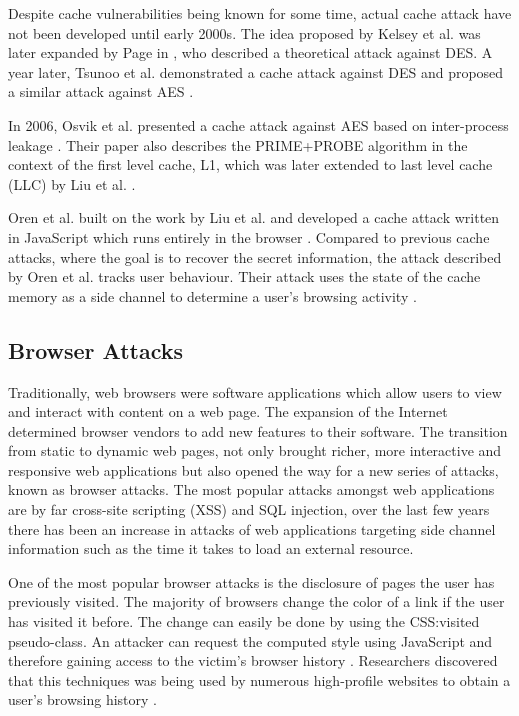 \documentclass[10pt,a4paper,twoside]{book}
\begin{document}
Despite cache vulnerabilities being known for some time, actual cache attack have not been developed until early 2000s. The idea proposed by Kelsey et al. was later expanded by Page in \cite{page2002theoretical}, who described a theoretical attack against DES. A year later, Tsunoo et al. demonstrated a cache attack against DES and proposed a similar attack against AES \cite{tsunoo2003cryptanalysis}.

In 2006, Osvik et al. presented a cache attack against AES based on inter-process leakage \cite{osvik2006cache}. Their paper also describes the PRIME+PROBE algorithm in the context of the first level cache, L1, which was later extended to last level cache (LLC) by Liu et al. \cite{liu2015last}.

Oren et al. built on the work by Liu et al. and developed a cache attack written in JavaScript which runs entirely in the browser \cite{oren2015spy}. Compared to previous cache attacks, where the goal is to recover the secret information, the attack described by Oren et al. tracks user behaviour. Their attack uses the state of the cache memory as a side channel to determine a user's browsing activity \cite{oren2015spy}.


\subsection{Browser Attacks}
Traditionally, web browsers were software applications which allow users to view and interact with content on a web page. The expansion of the Internet determined browser vendors to add new features to their software. The transition from static to dynamic web pages, not only brought richer, more interactive and responsive web applications but also opened the way for a new series of attacks, known as browser attacks. The most popular attacks amongst web applications are by far cross-site scripting (XSS) and SQL injection, over the last few years there has been an increase in attacks of web applications targeting side channel information such as the time it takes to load an external resource.

One of the most popular browser attacks is the disclosure of pages the user has previously visited. The majority of browsers change the color of a link if the user has visited it before. The change can easily be done by using the CSS:visited pseudo-class. An attacker can request the computed style using JavaScript and therefore gaining access to the victim's browser history \cite{cssvisited}. Researchers discovered that this techniques was being used by numerous high-profile websites to obtain a user's browsing history
\cite{jang2010empirical}.
\end{document}
